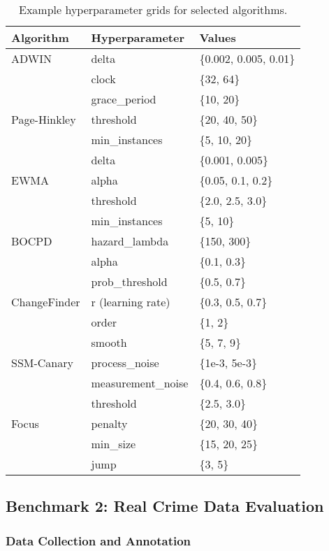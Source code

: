 \documentclass[journal,article,submit,pdftex,moreauthors]{Definitions/mdpi}
\begin{document}
\begin{table}[H]
\caption{Example hyperparameter grids for selected algorithms.\label{tab:param\_grids}}
\centering
\begin{tabular}{lll}
\toprule
\textbf{Algorithm} & \textbf{Hyperparameter} & \textbf{Values} \\
\midrule
ADWIN & delta & \{0.002, 0.005, 0.01\} \\
 & clock & \{32, 64\} \\
 & grace\_period & \{10, 20\} \\
\midrule
Page-Hinkley & threshold & \{20, 40, 50\} \\
 & min\_instances & \{5, 10, 20\} \\
 & delta & \{0.001, 0.005\} \\
\midrule
EWMA & alpha & \{0.05, 0.1, 0.2\} \\
 & threshold & \{2.0, 2.5, 3.0\} \\
 & min\_instances & \{5, 10\} \\
\midrule
BOCPD & hazard\_lambda & \{150, 300\} \\
 & alpha & \{0.1, 0.3\} \\
 & prob\_threshold & \{0.5, 0.7\} \\
\midrule
ChangeFinder & r (learning rate) & \{0.3, 0.5, 0.7\} \\
 & order & \{1, 2\} \\
 & smooth & \{5, 7, 9\} \\
\midrule
SSM-Canary & process\_noise & \{1e-3, 5e-3\} \\
 & measurement\_noise & \{0.4, 0.6, 0.8\} \\
 & threshold & \{2.5, 3.0\} \\
\midrule
Focus & penalty & \{20, 30, 40\} \\
 & min\_size & \{15, 20, 25\} \\
 & jump & \{3, 5\} \\
\bottomrule
\end{tabular}
\end{table}

\subsection{Benchmark 2: Real Crime Data Evaluation}

\subsubsection{Data Collection and Annotation}
\end{document}
